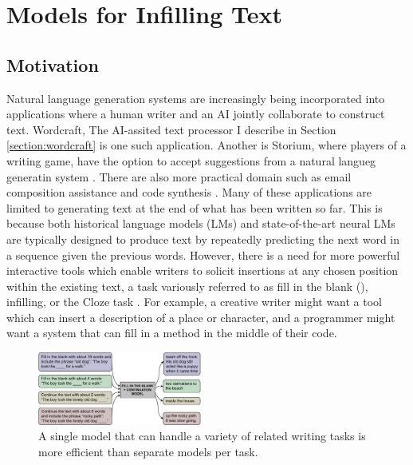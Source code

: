 \section{Models for Infilling Text}
\label{section:fitb}

\subsection{Motivation}

Natural language generation systems are increasingly being incorporated into applications where a human writer and an AI jointly collaborate to construct text.
Wordcraft, The AI-assited text processor I describe in Section \ref{section:wordcraft} is one such application.
Another is Storium, where players of a writing game, have the option to accept suggestions from a natural langueg generatin system \citep{akoury2020storium}.
There are also more practical domain such as email composition assistance and code synthesis \citep{buschek2021impact,wu2018smart,austin2021program}.
Many of these applications are limited to generating text at the end of what has been written so far.
This is because
both historical language models (LMs) and state-of-the-art neural LMs
are typically designed to produce text by repeatedly predicting the next word in a sequence given the previous words.
However, there is a need for more powerful interactive tools which enable writers to solicit insertions at any chosen position within the existing text, a task variously referred to as fill in the blank (\FitB), infilling, or the Cloze task \citep{taylor1953cloze}.
For example, a creative writer might want a tool which can insert a description of a place or character, and a programmer might want a system that can fill in a method in the middle of their code.

\begin{figure}[t]
    \centering
    \includegraphics[width=0.48\textwidth]{figures/leading_figure.pdf}
    \caption{A single model that can handle a variety of related writing tasks is more efficient than separate models per task.}
    \label{fig:leading_figure}
    \vspace{-1em}
\end{figure}

